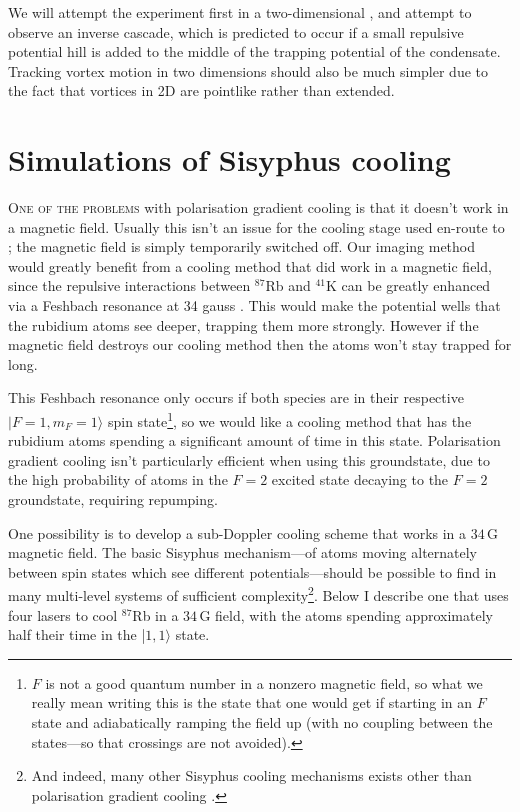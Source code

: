 We will attempt the experiment first in a two-dimensional \bec, and attempt to observe an inverse cascade, which is predicted to occur if a small repulsive potential hill is added to the middle of the trapping potential of the condensate. Tracking vortex motion in two dimensions should also be much simpler due to the fact that vortices in 2D are pointlike rather than extended.


\section{Simulations of Sisyphus cooling}\label{sec:atoms}

\lettrine[lines=3]{O}{ne of the problems} with polarisation gradient cooling is that it doesn't work in a magnetic field. Usually this isn't an issue for the cooling stage used en-route to \bec; the magnetic field is simply temporarily switched off. Our imaging method would greatly benefit from a cooling method that did work in a magnetic field, since the repulsive interactions between $^{87}$Rb and $^{41}$K can be greatly enhanced via a Feshbach resonance at 34 gauss \cite{thalhammer_double_2008}. This would make the potential wells that the rubidium atoms see deeper, trapping them more strongly. However if the magnetic field destroys our cooling method then the atoms won't stay trapped for long.

This Feshbach resonance only occurs if both species are in their respective \mbox{$|F=1,m_F=1\rangle$} spin state\footnote{$F$ is not a good quantum number in a nonzero magnetic field, so what we really mean writing this is the state that one would get if starting in an $F$ state and adiabatically ramping the field up (with no coupling between the states---so that crossings are not avoided).}, so we would like a cooling method that has the rubidium atoms spending a significant amount of time in this state. Polarisation gradient cooling isn't particularly efficient when using this groundstate, due to the high probability of atoms in the $F=2$ excited state decaying to the $F=2$ groundstate, requiring repumping.

One possibility is to develop a sub-Doppler cooling scheme that works in a $34\,$G magnetic field. The basic Sisyphus mechanism---of atoms moving alternately between spin states which see different potentials---should be possible to find in many multi-level systems of sufficient complexity\footnote{And indeed, many other Sisyphus cooling mechanisms exists other than polarisation gradient cooling \cite[p 116]{metcalf_laser_1999}.}. Below I describe one that uses four lasers to cool $^{87}$Rb in a $34\,$G field, with the atoms spending approximately half their time in the \mbox{|$1,1\rangle$} state.

